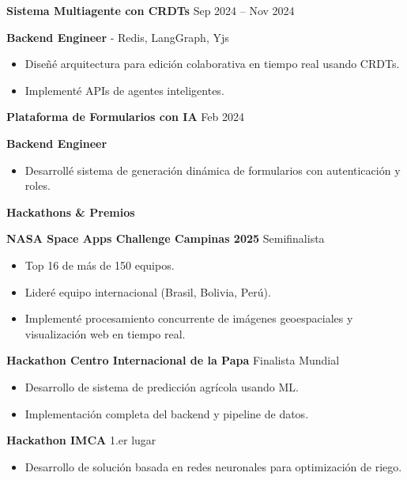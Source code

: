 \documentclass[11pt]{article}
\begin{document}
\textbf{Sistema Multiagente con CRDTs} \hfill Sep 2024 – Nov 2024



\textbf{Backend Engineer} - Redis, LangGraph, Yjs
\begin{itemize}[noitemsep]
\item Diseñé arquitectura para edición colaborativa en tiempo real usando CRDTs.
\item Implementé APIs de agentes inteligentes.
\end{itemize}

\textbf{Plataforma de Formularios con IA} \hfill Feb 2024

\textbf{Backend Engineer}
\begin{itemize}[noitemsep]
\item Desarrollé sistema de generación dinámica de formularios con autenticación y roles.
\end{itemize}

\vspace{10pt}

\begin{center}
\textbf{Hackathons \& Premios}
\end{center}

\textbf{NASA Space Apps Challenge Campinas 2025} \hfill Semifinalista
\begin{itemize}[noitemsep]
\item Top 16 de más de 150 equipos.
\item Lideré equipo internacional (Brasil, Bolivia, Perú).
\item Implementé procesamiento concurrente de imágenes geoespaciales y visualización web en tiempo real.
\end{itemize}

\textbf{Hackathon Centro Internacional de la Papa} \hfill Finalista Mundial
\begin{itemize}[noitemsep]
\item Desarrollo de sistema de predicción agrícola usando ML.
\item Implementación completa del backend y pipeline de datos.
\end{itemize}

\textbf{Hackathon IMCA} \hfill 1.er lugar
\begin{itemize}[noitemsep]
\item Desarrollo de solución basada en redes neuronales para optimización de riego.
\end{itemize}

\vspace{10pt}
\end{document}
